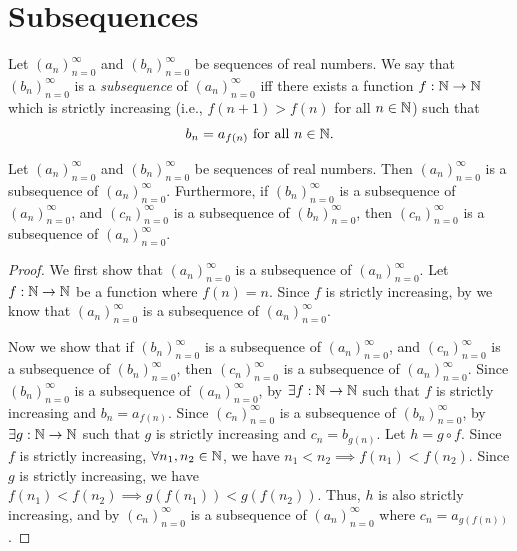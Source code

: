 \section{Subsequences}\label{i:sec:6.6}

\begin{defn}[Subsequences]\label{i:6.6.1}
  Let \((a_n)_{n = 0}^\infty\) and \((b_n)_{n = 0}^\infty\) be sequences of real numbers.
  We say that \((b_n)_{n = 0}^\infty\) is a \emph{subsequence} of \((a_n)_{n = 0}^\infty\) iff there exists a function \(f : \mathbb{N} \to \mathbb{N}\) which is strictly increasing (i.e., \(f(n + 1) > f(n)\) for all \(n \in \mathbb{N}\)) such that
  \[
    b_n = a_{f(n)} \text{ for all } n \in \mathbb{N}.
  \]
\end{defn}

\setcounter{thm}{3}
\begin{lem}\label{i:6.6.4}
  Let \((a_n)_{n = 0}^\infty\) and \((b_n)_{n = 0}^\infty\) be sequences of real numbers.
  Then \((a_n)_{n = 0}^\infty\) is a subsequence of \((a_n)_{n = 0}^\infty\).
  Furthermore, if \((b_n)_{n = 0}^\infty\) is a subsequence of \((a_n)_{n = 0}^\infty\), and \((c_n)_{n = 0}^\infty\) is a subsequence of \((b_n)_{n = 0}^\infty\), then \((c_n)_{n = 0}^\infty\) is a subsequence of \((a_n)_{n = 0}^\infty\).
\end{lem}

\begin{proof}
  We first show that \((a_n)_{n = 0}^\infty\) is a subsequence of \((a_n)_{n = 0}^\infty\).
  Let \(f : \mathbb{N} \to \mathbb{N}\) be a function where \(f(n) = n\).
  Since \(f\) is strictly increasing, by  we know that \((a_n)_{n = 0}^\infty\) is a subsequence of \((a_n)_{n = 0}^\infty\).

  Now we show that if \((b_n)_{n = 0}^\infty\) is a subsequence of \((a_n)_{n = 0}^\infty\), and \((c_n)_{n = 0}^\infty\) is a subsequence of \((b_n)_{n = 0}^\infty\), then \((c_n)_{n = 0}^\infty\) is a subsequence of \((a_n)_{n = 0}^\infty\).
  Since \((b_n)_{n = 0}^\infty\) is a subsequence of \((a_n)_{n = 0}^\infty\), by  \(\exists f : \mathbb{N} \to \mathbb{N}\) such that \(f\) is strictly increasing and \(b_n = a_{f(n)}\).
  Since \((c_n)_{n = 0}^\infty\) is a subsequence of \((b_n)_{n = 0}^\infty\), by  \(\exists g : \mathbb{N} \to \mathbb{N}\) such that \(g\) is strictly increasing and \(c_n = b_{g(n)}\).
  Let \(h = g \circ f\).
  Since \(f\) is strictly increasing, \(\forall n_1, n_2 \in \mathbb{N}\), we have \(n_1 < n_2 \implies f(n_1) < f(n_2)\).
  Since \(g\) is strictly increasing, we have \(f(n_1) < f(n_2) \implies g(f(n_1)) < g(f(n_2))\).
  Thus, \(h\) is also strictly increasing, and by  \((c_n)_{n = 0}^\infty\) is a subsequence of \((a_n)_{n = 0}^\infty\) where \(c_n = a_{g(f(n))}\).
\end{proof}

